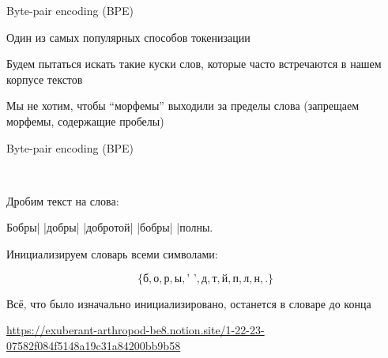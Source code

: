 \documentclass[notes,12pt, aspectratio=169]{beamer}
\newenvironment{wideitemize}{\itemize\addtolength{\itemsep}{10pt}}{\enditemize}
\begin{document}
\begin{frame}{Byte-pair encoding (BPE)}
	\begin{wideitemize} 
		\item  Один из самых популярных способов токенизации
		\item  Будем пытаться искать такие куски слов, которые часто встречаются в нашем корпусе текстов
		\item  Мы не хотим, чтобы “морфемы” выходили за пределы слова (запрещаем морфемы, содержащие пробелы)
	\end{wideitemize}
\end{frame} 


\begin{frame}{Byte-pair encoding (BPE)}
	
	
	\mbox{  }
	
	\begin{wideitemize} 
		\item \alert{Дробим текст на слова:}  
		
		\begin{center}
			Бобры| |добры| |добротой| |бобры| |полны.
		\end{center}
		
		\item \alert{Инициализируем словарь всеми символами:}
		
		\[
		\{ \text{б}, \text{о}, \text{р}, \text{ы},  \text{' '} , \text{д},  
		\text{т},  \text{й},  \text{п},  \text{л},  \text{н},  \text{.}  \}
		\]
		
		\item Всё, что было изначально инициализировано, останется в словаре до конца
		
	\end{wideitemize}
	\vfill
	\footnotesize  {\color{blue} \url{https://exuberant-arthropod-be8.notion.site/1-22-23-07582f084f5148a19c31a84200bb9b58}}
\end{frame} 
\end{document}
